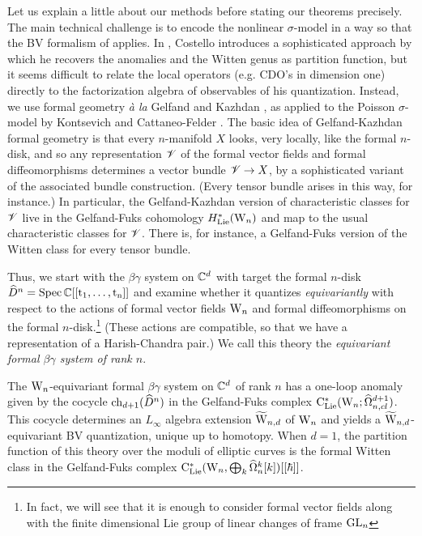 Let us explain a little about our methods before stating our theorems precisely. 
The main technical challenge is to encode the nonlinear $\sigma$-model in a way so that the BV formalism of \cite{CostelloRenormalization} applies. 
In \cite{WG2}, Costello introduces a sophisticated approach by which he recovers the anomalies and the Witten genus as partition function, but it seems difficult to relate the local operators (e.g. CDO's in dimension one) directly to the factorization algebra of observables of his quantization. 
Instead, we use formal geometry {\it \`a la} Gelfand and Kazhdan \cite{GK}, as applied to the Poisson $\sigma$-model by Kontsevich \cite{KonDQ} and Cattaneo-Felder \cite{CF}.
The basic idea of Gelfand-Kazhdan formal geometry is that every $n$-manifold $X$ looks, very locally, like the formal $n$-disk, and so any representation $\mathscr V$ of the formal vector fields and formal diffeomorphisms determines a vector bundle $\mathscr V \to X$, by a sophisticated variant of the associated bundle construction. (Every tensor bundle arises in this way, for instance.) In particular, the Gelfand-Kazhdan version of characteristic classes for $\mathscr V$ live in the Gelfand-Fuks cohomology $H^*_{\rm Lie}({{\rm W}_n})$ and map to the usual characteristic classes for $\mathscr V$. There is, for instance, a Gelfand-Fuks version of the Witten class for every tensor bundle.

Thus, we start with the $\beta\gamma$ system on $\mathbb C^d$ with target the formal $n$-disk $\widehat{D}^n = \rm{Spec}\,\mathbb C[[t_1,\ldots,t_n]]$ and examine whether it quantizes \emph{equivariantly} with respect to the actions of formal vector fields ${{\rm W}_n}$ and formal diffeomorphisms on the formal $n$-disk.\footnote{In fact, we will see that it is enough to consider formal vector fields along with the finite dimensional Lie group of linear changes of frame ${\rm GL}_n$} (These actions are compatible, so that we have a representation of a Harish-Chandra pair.) We call this theory the \emph{equivariant formal $\beta\gamma$ system of rank $n$}.

\begin{thm}
The ${{\rm W}_n}$-equivariant formal $\beta\gamma$ system on $\mathbb C^d$ of rank $n$ has a one-loop anomaly given by the cocycle ${\rm ch}_{d+1} (\widehat{D}^n)$ in the Gelfand-Fuks complex ${\rm C}_{{\rm Lie}}^*({{\rm W}_n} ; \widehat{\Omega}^{d+1}_{n,cl})$. 
This cocycle determines an $L_\infty$ algebra extension $\widetilde{\rm W}_{n,d}$ of ${{\rm W}_n}$ and yields a $\widetilde{\rm W}_{n,d}$-equivariant BV quantization, unique up to homotopy. 
When $d=1$, the partition function of this theory over the moduli of elliptic curves is the formal Witten class in the Gelfand-Fuks complex ${\rm C}_{{\rm Lie}}^*({{\rm W}_n}, \bigoplus_k \widehat{\Omega}_n^k[k])[[\hbar]]$.
\end{thm}

